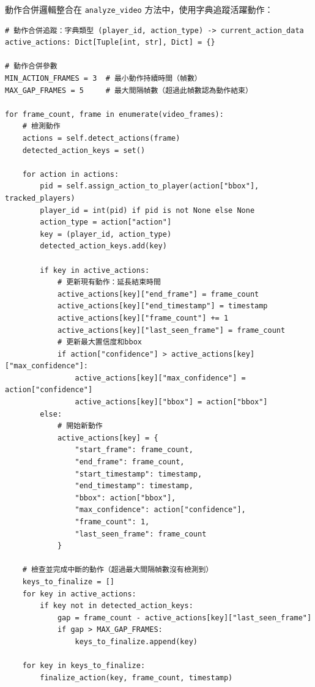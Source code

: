 \documentclass[a4paper,14pt,oneside]{article}
\begin{document}
動作合併邏輯整合在 \texttt{analyze\_video} 方法中，使用字典追蹤活躍動作：

\begin{lstlisting}[style=pythonstyle, caption={動作合併核心邏輯（在 analyze\_video 中）}]
# 動作合併追蹤：字典類型 (player_id, action_type) -> current_action_data
active_actions: Dict[Tuple[int, str], Dict] = {}

# 動作合併參數
MIN_ACTION_FRAMES = 3  # 最小動作持續時間（幀數）
MAX_GAP_FRAMES = 5     # 最大間隔幀數（超過此幀數認為動作結束）

for frame_count, frame in enumerate(video_frames):
    # 檢測動作
    actions = self.detect_actions(frame)
    detected_action_keys = set()
    
    for action in actions:
        pid = self.assign_action_to_player(action["bbox"], tracked_players)
        player_id = int(pid) if pid is not None else None
        action_type = action["action"]
        key = (player_id, action_type)
        detected_action_keys.add(key)
        
        if key in active_actions:
            # 更新現有動作：延長結束時間
            active_actions[key]["end_frame"] = frame_count
            active_actions[key]["end_timestamp"] = timestamp
            active_actions[key]["frame_count"] += 1
            active_actions[key]["last_seen_frame"] = frame_count
            # 更新最大置信度和bbox
            if action["confidence"] > active_actions[key]["max_confidence"]:
                active_actions[key]["max_confidence"] = action["confidence"]
                active_actions[key]["bbox"] = action["bbox"]
        else:
            # 開始新動作
            active_actions[key] = {
                "start_frame": frame_count,
                "end_frame": frame_count,
                "start_timestamp": timestamp,
                "end_timestamp": timestamp,
                "bbox": action["bbox"],
                "max_confidence": action["confidence"],
                "frame_count": 1,
                "last_seen_frame": frame_count
            }
    
    # 檢查並完成中斷的動作（超過最大間隔幀數沒有檢測到）
    keys_to_finalize = []
    for key in active_actions:
        if key not in detected_action_keys:
            gap = frame_count - active_actions[key]["last_seen_frame"]
            if gap > MAX_GAP_FRAMES:
                keys_to_finalize.append(key)
    
    for key in keys_to_finalize:
        finalize_action(key, frame_count, timestamp)
\end{lstlisting}
\end{document}
